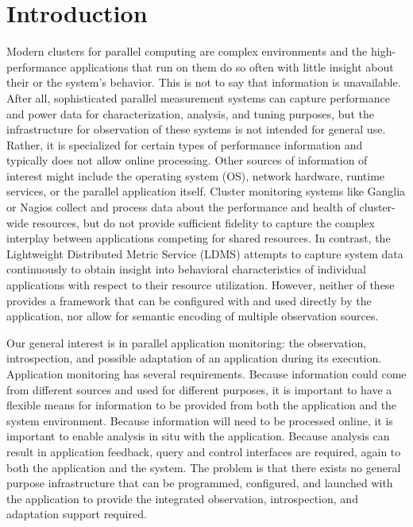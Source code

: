 
\section{Introduction}
Modern clusters for parallel computing are complex environments and the
high-performance applications that run on them do so often with little
insight about their or the system's behavior.  This is not to say that
information is unavailable.  After all, sophisticated parallel measurement
systems can capture performance and power data for characterization,
analysis, and tuning purposes, but the infrastructure for observation of
these systems is not intended for general use.  Rather, it is specialized
for certain types of performance information and typically does not allow
online processing.  Other sources of information of interest might include
the operating system (OS), network hardware, runtime services, or the
parallel application itself.  Cluster monitoring systems like Ganglia or
Nagios collect and process data about the performance and health of
cluster-wide resources, but do not provide sufficient fidelity to capture
the complex interplay between applications competing for shared resources.
In contrast, the Lightweight Distributed Metric Service (LDMS) attempts to
capture system data continuously to obtain insight into behavioral
characteristics of individual applications with respect to their resource
utilization.  However, neither of these provides a framework that can be
configured with and used directly by the application, nor allow for 
semantic encoding of multiple observation sources.

Our general interest is in parallel application monitoring: the
observation, introspection, and possible adaptation of an application
during its execution.  Application monitoring has several requirements.
Because information could come from different sources and used for
different purposes, it is important to have a flexible means for
information to be provided from both the application and the system
environment.  Because information will need to be processed online, it is
important to enable analysis in situ with the application.  Because
analysis can result in application feedback, query and control interfaces
are required, again to both the application and the system.  The problem is
that there exists no general purpose infrastructure that can be programmed,
configured, and launched with the application to provide the integrated
observation, introspection, and adaptation support required.

